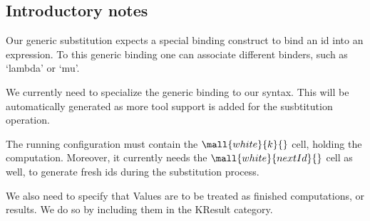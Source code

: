 \begin{latexComment}
\section{Introductory notes}

Our generic substitution expects a special binding construct to bind 
an id into an expression.  
To this generic binding one can associate different binders, such as 
`lambda' or `mu'.

We currently need to specialize the generic binding to our syntax. 
This will be automatically generated as more tool support is added 
for the susbtitution operation.

The running configuration must contain the $\mall{white}{k}{}$ cell, 
holding the computation.  
Moreover, it currently needs the  $\mall{white}{nextId}{}$ cell as well,
to generate fresh ids during the substitution process.

We also need to specify that Values are to be treated as finished computations,
or results.  
We do so by including them in the KResult category.
\end{latexComment}
